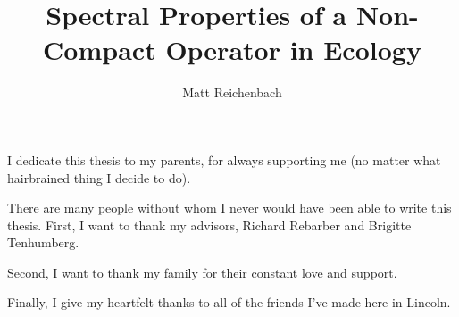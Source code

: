 \documentclass[final]{nuthesis}
\theoremstyle{definition}
\numberwithin{theorem}{section}
\numberwithin{lemma}{section}
\numberwithin{corollary}{section}
\numberwithin{definition}{section}
\numberwithin{equation}{section}
\begin{document}
\frontmatter

\title{Spectral Properties of a Non-Compact Operator in Ecology}
\author{Matt Reichenbach}
\maketitle



\begin{dedication}
    I dedicate this thesis to my parents, for always supporting me (no matter what hairbrained thing I decide to do).
\end{dedication}

\begin{acknowledgments}
	There are many people without whom I never would have been able to write this thesis. First, I want to thank my advisors, Richard Rebarber and Brigitte Tenhumberg. 
	
	Second, I want to thank my family for their constant love and support.
	
	Finally, I give my heartfelt thanks to all of the friends I've made here in Lincoln.
\end{acknowledgments}


\tableofcontents
\end{document}
